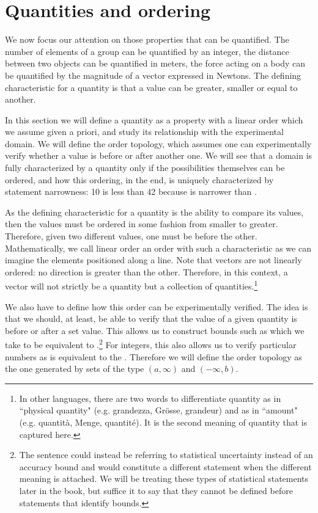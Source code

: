 \documentclass[11pt,letterpaper,fleqn]{memoir} %
\begin{document}
\section{Quantities and ordering}

We now focus our attention on those properties that can be quantified. The number of elements of a group can be quantified by an integer, the distance between two objects can be quantified in meters, the force acting on a body can be quantified by the magnitude of a vector expressed in Newtons. The defining characteristic for a quantity is that a value can be greater, smaller or equal to another.

In this section we will define a quantity as a property with a linear order which we assume given a priori, and study its relationship with the experimental domain. We will define the order topology, which assumes one can experimentally verify whether a value is before or after another one. We will see that a domain is fully characterized by a quantity only if the possibilities themselves can be ordered, and how this ordering, in the end, is uniquely characterized by statement narrowness: 10 is less than 42 because  is narrower than .

As the defining characteristic for a quantity is the ability to compare its values, then the values must be ordered in some fashion from smaller to greater. Therefore, given two different values, one must be before the other. Mathematically, we call linear order an order with such a characteristic as we can imagine the elements positioned along a line. Note that vectors are not linearly ordered: no direction is greater than the other. Therefore, in this context, a vector will not strictly be a quantity but a collection of quantities.\footnote{In other languages, there are two words to differentiate quantity as in ``physical quantity" (e.g. grandezza, Gr\"osse, grandeur) and as in ``amount" (e.g. quantit\`a, Menge, quantit\'e). It is the second meaning of quantity that is captured here.}

We also have to define how this order can be experimentally verified. The idea is that we should, at least, be able to verify that the value of a given quantity is before or after a set value. This allows us to construct bounds such as  which we take to be equivalent to .\footnote{The sentence  could instead be referring to statistical uncertainty instead of an accuracy bound and would constitute a different statement when the different meaning is attached. We will be treating these types of statistical statements later in the book, but suffice it to say that they cannot be defined before statements that identify bounds.} For integers, this also allows us to verify particular numbers as  is equivalent to the . Therefore we will define the order topology as the one generated by sets of the type $(a, \infty)$ and $(-\infty, b)$.
\end{document}
